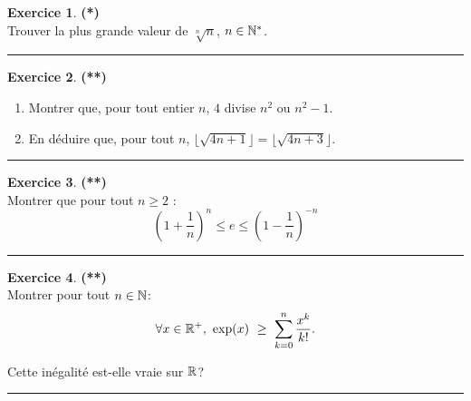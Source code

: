 \documentclass[a4paper,11pt]{article}
\theoremstyle{definition}
\newtheorem{exo}{Exercice} %
\begin{document}
\begin{minipage}{1\linewidth}
\begin{minipage}[t]{0.48\linewidth}
		
	\end{minipage}	
	\hfill\vrule\hfill
	\begin{minipage}[t]{0.48\linewidth}
		\raggedright
		
				\begin{exo}\textbf{(*)}\quad\\[0.2cm]
		Trouver la plus grande valeur de $\sqrt[n]{n}$, $n\in\mathbb{N}^*$.
		
		\centering
		\rule{1\linewidth}{0.6pt}
	\end{exo}
		
		\begin{exo}\textbf{(**)}\quad\\[0.2cm]
			\begin{enumerate}
				\item Montrer que, pour tout entier $n$, $4$ divise $n^2$ ou $n^2 - 1$.
				\item En déduire que, pour tout $n$, $\lfloor\sqrt{4n + 1}\rfloor=  \lfloor\sqrt{4n + 3}\rfloor$.
			\end{enumerate}
	
			\centering
			\rule{1\linewidth}{0.6pt}
		\end{exo}
		
		
		
		\begin{exo}\textbf{(**)}\quad\\[0.2cm]
			Montrer que pour tout $n\geq 2$ :
			$$\left(1 + \dfrac{1}{n}\right)^n\leq e \leq \left(1 - \dfrac{1}{n}\right)^{-n}$$
			\centering
			\rule{1\linewidth}{0.6pt}
		\end{exo}
		


\begin{exo}\textbf{(**)}\quad\\[0.2cm]
	Montrer pour tout $n \in \mathbb{N}$:
	$$\forall x \in \R^+, \ 	\exp(x) \ \geq  \ \sum\limits^n_{k=0}\dfrac{x^k}{k!}.$$
	
	Cette inégalité est-elle vraie sur $\mathbb{R}$?
	
	\centering
	\rule{1\linewidth}{0.6pt}
\end{exo}
		
		
		
	\end{minipage}
\end{minipage}

\newpage
\end{document}
